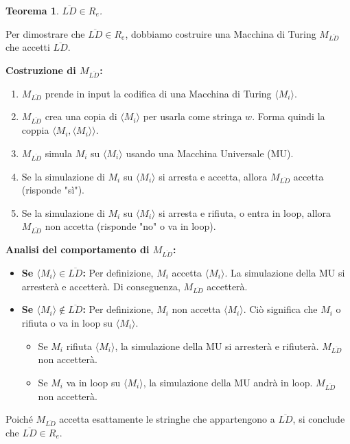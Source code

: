 \documentclass[a4paper]{article}
\makeatletter
\newtheorem{theorem}{Teorema}[section] %
\renewenvironment{proof}[1][\proofname]{\par
  \pushQED{\qed}%
  \normalfont \topsep6\p@\@plus6\p@\relax
  \trivlist
  \item[\hskip\labelsep
        \bfseries
    #1\@addpunct{.}]\ignorespaces
}{%
  \popQED\endtrivlist\@endpefalse
}
\makeatother
\begin{document}
\begin{theorem}
$\overline{LD} \in R_e$.
\end{theorem}
\begin{proof}
Per dimostrare che $\overline{LD} \in R_e$, dobbiamo costruire una Macchina di Turing $M_{\overline{LD}}$ che accetti $\overline{LD}$.

\textbf{Costruzione di $M_{\overline{LD}}$:}
\begin{enumerate}
    \item $M_{\overline{LD}}$ prende in input la codifica di una Macchina di Turing $\langle M_i \rangle$.
    \item $M_{\overline{LD}}$ crea una copia di $\langle M_i \rangle$ per usarla come stringa $w$. Forma quindi la coppia $\langle M_i, \langle M_i \rangle \rangle$.
    \item $M_{\overline{LD}}$ simula $M_i$ su $\langle M_i \rangle$ usando una Macchina Universale (MU).
    \item Se la simulazione di $M_i$ su $\langle M_i \rangle$ si arresta e accetta, allora $M_{\overline{LD}}$ accetta (risponde "sì").
    \item Se la simulazione di $M_i$ su $\langle M_i \rangle$ si arresta e rifiuta, o entra in loop, allora $M_{\overline{LD}}$ non accetta (risponde "no" o va in loop).
\end{enumerate}
\textbf{Analisi del comportamento di $M_{\overline{LD}}$:}
\begin{itemize}
    \item \textbf{Se $\langle M_i \rangle \in \overline{LD}$:}
    Per definizione, $M_i$ accetta $\langle M_i \rangle$. La simulazione della MU si arresterà e accetterà. Di conseguenza, $M_{\overline{LD}}$ accetterà.
    \item \textbf{Se $\langle M_i \rangle \notin \overline{LD}$:}
    Per definizione, $M_i$ non accetta $\langle M_i \rangle$. Ciò significa che $M_i$ o rifiuta o va in loop su $\langle M_i \rangle$.
    \begin{itemize}
        \item Se $M_i$ rifiuta $\langle M_i \rangle$, la simulazione della MU si arresterà e rifiuterà. $M_{\overline{LD}}$ non accetterà.
        \item Se $M_i$ va in loop su $\langle M_i \rangle$, la simulazione della MU andrà in loop. $M_{\overline{LD}}$ non accetterà.
    \end{itemize}
\end{itemize}
Poiché $M_{\overline{LD}}$ accetta esattamente le stringhe che appartengono a $\overline{LD}$, si conclude che $\overline{LD} \in R_e$.
\end{proof}
\end{document}
